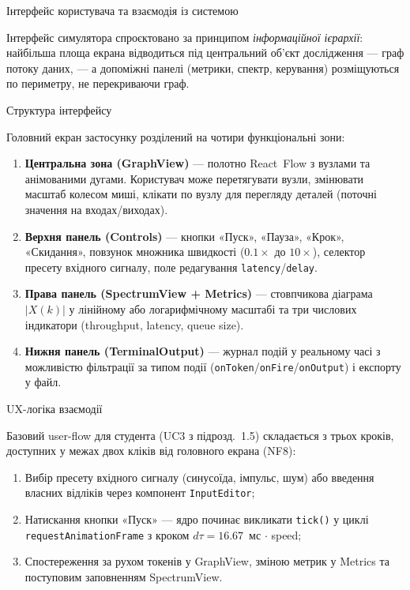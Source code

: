\protect{}\label{_Toc228121473}{}Інтерфейс користувача та
взаємодія із системою

Інтерфейс симулятора спроєктовано за принципом \emph{інформаційної
ієрархії}: найбільша площа екрана відводиться під центральний об'єкт
дослідження --- граф потоку даних, --- а допоміжні панелі (метрики,
спектр, керування) розміщуються по периметру, не перекриваючи граф.

Структура інтерфейсу

Головний екран застосунку розділений на чотири функціональні зони:

\begin{enumerate}
\def\labelenumi{\arabic{enumi}.}
\item
  \textbf{Центральна зона (GraphView)} --- полотно React~Flow з вузлами
  та анімованими дугами. Користувач може перетягувати вузли, змінювати
  масштаб колесом миші, клікати по вузлу для перегляду деталей (поточні
  значення на входах/виходах).
\item
  \textbf{Верхня панель (Controls)} --- кнопки «Пуск», «Пауза», «Крок»,
  «Скидання», повзунок множника швидкості (\(0.1 \times\) до
  \(10 \times\)), селектор пресету вхідного сигналу, поле редагування
  \texttt{latency}/\texttt{delay}.
\item
  \textbf{Права панель (SpectrumView + Metrics)} --- стовпчикова
  діаграма \(|X(k)|\) у лінійному або логарифмічному масштабі та три
  числових індикатори (throughput, latency, queue size).
\item
  \textbf{Нижня панель (TerminalOutput)} --- журнал подій у реальному
  часі з можливістю фільтрації за типом події
  (\texttt{onToken}/\texttt{onFire}/\texttt{onOutput}) і експорту у
  файл.
\end{enumerate}

UX-логіка взаємодії

Базовий user-flow для студента (UC3 з підрозд.~1.5) складається з трьох
кроків, доступних у межах двох кліків від головного екрана (NF8):

\begin{enumerate}
\def\labelenumi{\arabic{enumi}.}
\item
  Вибір пресету вхідного сигналу (синусоїда, імпульс, шум) або введення
  власних відліків через компонент \texttt{InputEditor};
\item
  Натискання кнопки «Пуск» --- ядро починає викликати \texttt{tick()} у
  циклі \texttt{requestAnimationFrame} з кроком \(d\tau = 16.67\)~мс
  \(\cdot\) speed;
\item
  Спостереження за рухом токенів у GraphView, зміною метрик у Metrics та
  поступовим заповненням SpectrumView.
\end{enumerate}

